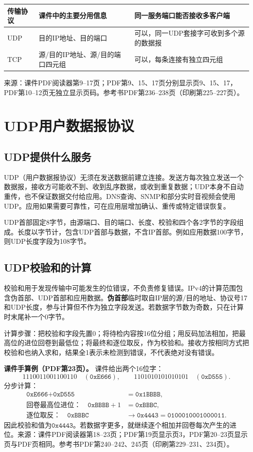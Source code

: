 \begin{center}\begin{tabular}{lll}\toprule 传输协议 & 课件中的主要分用信息 & 同一服务端口能否接收多客户端\\\midrule
UDP & 目的IP地址、目的端口 & 可以，同一UDP套接字可收到多个源的数据报\\
TCP & 源/目的IP地址、源/目的端口四元组 & 可以，每条连接有独立四元组\\\bottomrule\end{tabular}\end{center}
\annotationarea[4]
\small 来源：课件PDF阅读器第9--17页；PDF第9、15、17页分别显示页9、15、17，PDF第10--12页无独立显示页码。参考书PDF第236--238页（印刷第225--227页）。\normalsize

\section{UDP用户数据报协议}
\subsection{UDP提供什么服务}
UDP（用户数据报协议）无须在发送数据前建立连接。发送方每次独立发送一个数据报，接收方可能收不到、收到乱序数据，或收到重复数据；UDP本身不自动重传，也不保证数据交付给应用。DNS查询、SNMP和部分实时音视频会使用UDP。应用如果需要可靠性，可在应用层增加确认、重传或特定错误恢复。

UDP首部固定8字节，由源端口、目的端口、长度、校验和四个各2字节的字段组成。长度以字节计，包含UDP首部与数据，不含IP首部。例如应用数据100字节，则UDP长度字段为108字节。

\subsection{UDP校验和的计算}
校验和用于发现传输中可能发生的位错误，不负责修复错误。IPv4的计算范围包含伪首部、UDP首部和应用数据。\textbf{伪首部}临时取自IP层的源/目的地址、协议号17和UDP长度，参与计算但不作为独立字段发送。若数据字节数为奇数，只在计算时末尾补一个0字节。

计算步骤：把校验和字段先置0；将待检内容按16位分组；用反码加法相加，把最高位的进位回卷到最低位；将最终和逐位取反，作为校验和。接收方按相同方式把校验和也纳入求和，结果全1表示未检测到错误，不代表绝对没有错误。

\textbf{课件手算例（PDF第23页）。} 课件给出两个16位字：
\[
1110011001100110\quad(\texttt{0xE666}),\qquad
1101010101010101\quad(\texttt{0xD555}).
\]
分步计算：
\[
\begin{aligned}
\texttt{0xE666}+\texttt{0xD555}&=\texttt{0x1BBBB},\\
\text{回卷最高位进位：}\quad\texttt{0xBBBB}+1&=\texttt{0xBBBC},\\
\text{逐位取反：}\quad\texttt{0xBBBC}&\longrightarrow\texttt{0x4443}
 = \texttt{0100010001000011}.
\end{aligned}
\]
因此校验和值为$\texttt{0x4443}$。若数据字更多，就继续逐个相加并回卷每次产生的进位。\annotationarea[4]
\small 来源：课件PDF阅读器第18--23页；PDF第19页显示页3，PDF第20--23页显示页与PDF页相同。参考书PDF第240--242、245页（印刷第229--231、234页）。\normalsize

